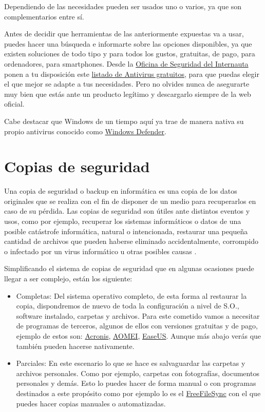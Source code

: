 \documentclass[
  a4paper,
  openany]{book}
\begin{document}
Dependiendo de las necesidades pueden ser usados uno o varios, ya que son complementarios entre sí.

Antes de decidir que herramientas de las anteriormente expuestas va a usar, puedes hacer una búsqueda e informarte sobre las opciones disponibles, ya que existen soluciones de todo tipo y para todos los gustos, gratuitas, de pago, para ordenadores, para smartphones. Desde la \href{https://www.osi.es}{Oficina de Seguridad del Internauta} ponen a tu disposición este \href{https://www.osi.es/es/herramientas-gratuitas?herramienta_selec\%5B0\%5D=115}{listado de Antivirus gratuitos}, para que puedas elegir el que mejor se adapte a tus necesidades. Pero no olvides nunca de asegurarte muy bien que estás ante un producto legítimo y descargarlo siempre de la web oficial.

Cabe destacar que Windows de un tiempo aquí ya trae de manera nativa su propio antivirus conocido como \href{https://www.microsoft.com/es-es/windows/comprehensive-security}{Windows Defender}.

\hypertarget{copias-de-seguridad}{%
\section{Copias de seguridad}\label{copias-de-seguridad}}

Una copia de seguridad o backup en informática es una copia de los datos originales que se realiza con el fin de disponer de un medio para recuperarlos en caso de su pérdida. Las copias de seguridad son útiles ante distintos eventos y usos, como por ejemplo, recuperar los sistemas informáticos o datos de una posible catástrofe informática, natural o intencionada, restaurar una pequeña cantidad de archivos que pueden haberse eliminado accidentalmente, corrompido o infectado por un virus informático u otras posibles causas \citep{WIKI-copias-seguridad}.

Simplificando el sistema de copias de seguridad que en algunas ocasiones puede llegar a ser complejo, están los siguiente:

\begin{itemize}
\item
  Completas: Del sistema operativo completo, de esta forma al restaurar la copia, dispondremos de nuevo de toda la configuración a nivel de S.O., software instalado, carpetas y archivos. Para este cometido vamos a necesitar de programas de terceros, algunos de ellos con versiones gratuitas y de pago, ejemplo de estos son: \href{https://www.acronis.com/}{Acronis}, \href{https://www.aomeitech.com/}{AOMEI}, \href{https://www.easeus.com/}{EaseUS}. Aunque más abajo verás que también pueden hacerse nativamente.
\item
  Parciales: En este escenario lo que se hace es salvaguardar las carpetas y archivos personales. Como por ejemplo, carpetas con fotografías, documentos personales y demás. Esto lo puedes hacer de forma manual o con programas destinados a este propósito como por ejemplo lo es el \href{https://freefilesync.org/}{FreeFileSync} con el que puedes hacer copias manuales o automatizadas.
\end{itemize}
\end{document}
